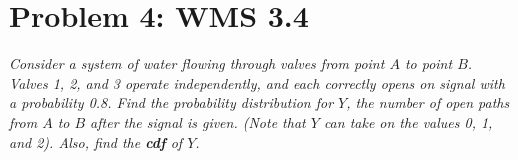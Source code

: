 \documentclass{article}
\begin{document}
	\section*{Problem 4: WMS 3.4}
	\emph{Consider a system of water flowing through valves from point $A$ to point $B$. Valves 1, 2, and 3 operate independently, and each correctly opens on signal with a probability 0.8. Find the probability distribution for $Y$, the number of open paths from $A$ to $B$ after the signal is given. (Note that $Y$ can take on the values 0, 1, and 2). Also, find the \textbf{cdf} of $Y$.} 
	\begin{center}
	\end{center}
\end{document}
